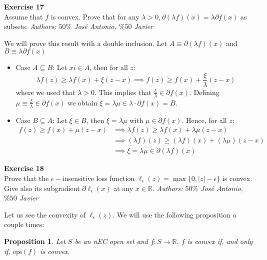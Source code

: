 \documentclass[11pt,table]{article}
\newenvironment{problem}[2][Exercise]
{ \begin{mdframed}[backgroundcolor=gray!20] \textbf{#1 #2} \\}
	{\hspace{0.0cm}\newline\newline \emph{Authors: \(50\%\) José Antonio, \(\%50\) Javier}  \end{mdframed}}
\newtheorem{nprop}{Proposition}
\newcommand\abs[1]{\lvert#1\rvert}
\newcommand\R{\mathbb R}
\begin{document}
\begin{problem}{17}
Assume that \( f \)  is convex. Prove that for any \( \lambda > 0, \partial(\lambda f)(x) = \lambda \partial f(x) \) as subsets.
\end{problem}

We will prove this result with a double inclusion. Let $A \equiv \partial(\lambda f)(x)$ and $B \equiv \lambda \partial f(x)$

\begin{itemize}
	\item Case $A \subseteq B$: Let $xi \in A$, then for all $z$:
	      \[
		      \lambda f(z) \ge \lambda f(x) + \xi (z-x) \implies f(z) \ge f(x) + \frac{\xi}{\lambda}(z-x)
	      \]
	      where we used that $\lambda > 0$. This implies that $\frac{\xi}{\lambda} \in \partial f(x)$. Defining $\mu \equiv \frac{\xi}{\lambda} \in \partial f(x)$ we obtain $\xi = \lambda \mu \in \lambda \cdot \partial f(x) = B$.

	\item Case $B \subseteq A$: Let $\xi \in B$, then $\xi = \lambda \mu$ with $\mu \in \partial f(x)$. Hence, for all $z$:
	      \begin{align*}
		      f(z) \ge f(x) + \mu(z-x) & \implies \lambda f(z) \ge \lambda f(x) + \lambda\mu(z-x)       \\
		                               & \implies (\lambda f)(z) \ge (\lambda f)(x) + (\lambda\mu)(z-x) \\
		                               & \implies \xi = \lambda \mu \in \partial(\lambda f)(x)
	      \end{align*}
\end{itemize}

\begin{problem}{18}
Prove that the \(\epsilon-\)insensitive loss function \(\ell_\epsilon(z) = \max\{0,\abs{z} - \epsilon\}\) is convex. Give also its subgradient \(\partial \ell_\epsilon(x)\) at any \(x \in \R\).
\end{problem}


Let us see the convexity of \(\ell_\epsilon(z)\). We will use the following proposition a couple times:
\begin{nprop}
	Let \(S\) be an nEC open set and \(f:S\to \R\). \(f\) is convex if, and only if, \(\text{epi}(f)\) is convex.
\end{nprop}
\end{document}
